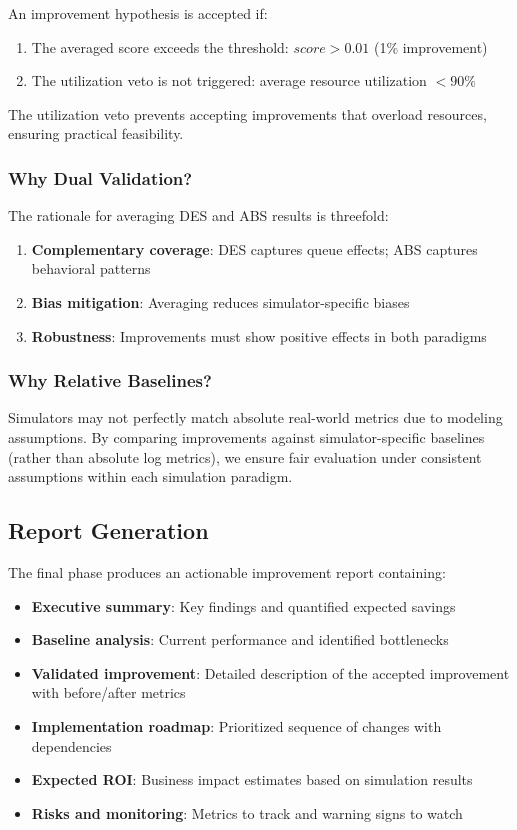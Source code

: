 \documentclass[preprint,12pt]{elsarticle}
\begin{document}
An improvement hypothesis is accepted if:
\begin{enumerate}
    \item The averaged score exceeds the threshold: $score > 0.01$ (1\% improvement)
    \item The utilization veto is not triggered: average resource utilization $< 90\%$
\end{enumerate}

The utilization veto prevents accepting improvements that overload resources, ensuring practical feasibility.

\subsubsection{Why Dual Validation?}

The rationale for averaging DES and ABS results is threefold:

\begin{enumerate}
    \item \textbf{Complementary coverage}: DES captures queue effects; ABS captures behavioral patterns
    \item \textbf{Bias mitigation}: Averaging reduces simulator-specific biases
    \item \textbf{Robustness}: Improvements must show positive effects in both paradigms
\end{enumerate}

\subsubsection{Why Relative Baselines?}

Simulators may not perfectly match absolute real-world metrics due to modeling assumptions. By comparing improvements against simulator-specific baselines (rather than absolute log metrics), we ensure fair evaluation under consistent assumptions within each simulation paradigm.

\subsection{Report Generation}

The final phase produces an actionable improvement report containing:

\begin{itemize}
    \item \textbf{Executive summary}: Key findings and quantified expected savings
    \item \textbf{Baseline analysis}: Current performance and identified bottlenecks
    \item \textbf{Validated improvement}: Detailed description of the accepted improvement with before/after metrics
    \item \textbf{Implementation roadmap}: Prioritized sequence of changes with dependencies
    \item \textbf{Expected ROI}: Business impact estimates based on simulation results
    \item \textbf{Risks and monitoring}: Metrics to track and warning signs to watch
\end{itemize}
\end{document}
